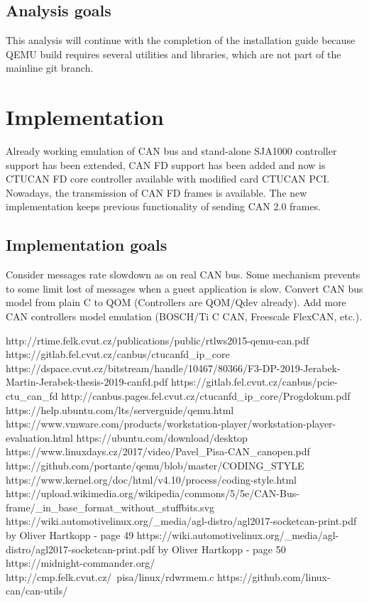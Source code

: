 \documentclass{ctuthesis}
\begin{document}
 \subsection{Analysis goals}
 This analysis will continue with the completion of the installation guide because QEMU build requires several utilities and libraries, which are not part of the mainline git branch.
 \section{Implementation}
 Already working emulation of CAN bus and stand-alone SJA1000 controller support has been extended, CAN FD support has been added and now is CTUCAN FD core controller available with modified card CTUCAN PCI. Nowadays, the transmission of CAN FD frames is available. The new implementation keeps previous functionality of sending CAN 2.0 frames.
 \subsection{Implementation goals}
 Consider messages rate slowdown as on real CAN bus. Some mechanism prevents to some limit lost of messages when a guest application is slow. Convert CAN bus model from plain C to QOM (Controllers are QOM/Qdev already). Add more CAN controllers model emulation (BOSCH/Ti C CAN, Freescale FlexCAN, etc.).
 
 
\renewcommand\bibname{References}
\begin{thebibliography}{1}
 http://rtime.felk.cvut.cz/publications/public/rtlws2015-qemu-can.pdf
 https://gitlab.fel.cvut.cz/canbus/ctucanfd\_ip\_core
 https://dspace.cvut.cz/bitstream/handle/10467/80366/F3-DP-2019-Jerabek-Martin-Jerabek-thesis-2019-canfd.pdf
 https://gitlab.fel.cvut.cz/canbus/pcie-ctu\_can\_fd
 http://canbus.pages.fel.cvut.cz/ctucanfd\_ip\_core/Progdokum.pdf
 https://help.ubuntu.com/lts/serverguide/qemu.html
 https://www.vmware.com/products/workstation-player/workstation-player-evaluation.html
 https://ubuntu.com/download/desktop
 https://www.linuxdays.cz/2017/video/Pavel\_Pisa-CAN\_canopen.pdf
 https://github.com/portante/qemu/blob/master/CODING\_STYLE
 https://www.kernel.org/doc/html/v4.10/process/coding-style.html
 https://upload.wikimedia.org/wikipedia/commons/5/5e/CAN-Bus-frame/\_in\_base\_format\_without\_stuffbits.svg
 https://wiki.automotivelinux.org/\_media/agl-distro/agl2017-socketcan-print.pdf by Oliver Hartkopp - page 49
 https://wiki.automotivelinux.org/\_media/agl-distro/agl2017-socketcan-print.pdf by Oliver Hartkopp - page 50
 https://midnight-commander.org/
 http://cmp.felk.cvut.cz/~pisa/linux/rdwrmem.c
 https://github.com/linux-can/can-utils/
\end{thebibliography}
\end{document}
